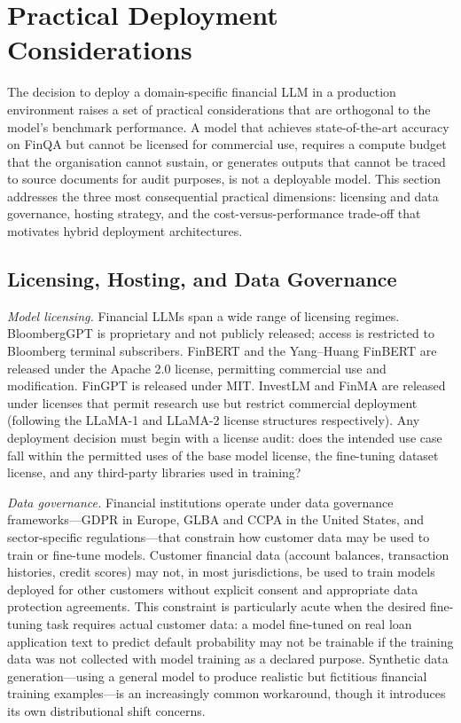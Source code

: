\section{Practical Deployment Considerations}
\label{sec:ch08-deployment}

The decision to deploy a domain-specific financial LLM in a production environment
raises a set of practical considerations that are orthogonal to the model's
benchmark performance.  A model that achieves state-of-the-art accuracy on FinQA
but cannot be licensed for commercial use, requires a compute budget that the
organisation cannot sustain, or generates outputs that cannot be traced to source
documents for audit purposes, is not a deployable model.  This section addresses
the three most consequential practical dimensions: licensing and data governance,
hosting strategy, and the cost-versus-performance trade-off that motivates hybrid
deployment architectures.

\subsection{Licensing, Hosting, and Data Governance}
\label{sec:ch08-licensing-hosting}

\textit{Model licensing.}  Financial LLMs span a wide range of licensing regimes.
BloombergGPT is proprietary and not publicly released; access is restricted to
Bloomberg terminal subscribers.  FinBERT \cite{araci2019finbert} and the
Yang--Huang FinBERT \cite{yang2020finbert} are released under the Apache 2.0
license, permitting commercial use and modification.  FinGPT \cite{Yang2023}
is released under MIT.  InvestLM \cite{yang2023investlm} and FinMA
\cite{xie2023pixiu} are released under licenses that permit research use but
restrict commercial deployment (following the LLaMA-1 and LLaMA-2 license
structures respectively).  Any deployment decision must begin with a license audit:
does the intended use case fall within the permitted uses of the base model license,
the fine-tuning dataset license, and any third-party libraries used in training?

\textit{Data governance.}  Financial institutions operate under data governance
frameworks---GDPR in Europe, GLBA and CCPA in the United States, and sector-specific
regulations---that constrain how customer data may be used to train or fine-tune
models.  Customer financial data (account balances, transaction histories, credit
scores) may not, in most jurisdictions, be used to train models deployed for other
customers without explicit consent and appropriate data protection agreements.
This constraint is particularly acute when the desired fine-tuning task requires
actual customer data: a model fine-tuned on real loan application text to predict
default probability may not be trainable if the training data was not collected
with model training as a declared purpose.  Synthetic data generation---using a
general model to produce realistic but fictitious financial training examples---is
an increasingly common workaround, though it introduces its own distributional
shift concerns.

